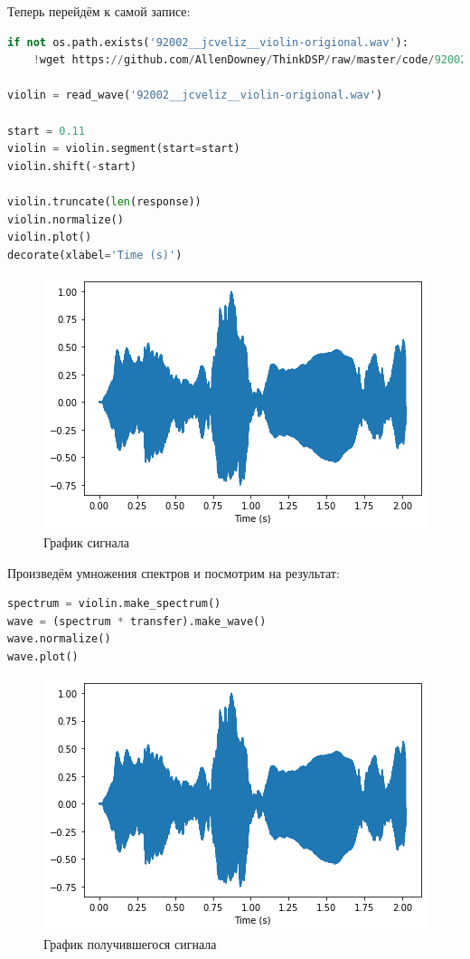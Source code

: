 Теперь перейдём к самой записе:

\begin{lstlisting}[language=Python]
if not os.path.exists('92002__jcveliz__violin-origional.wav'):
    !wget https://github.com/AllenDowney/ThinkDSP/raw/master/code/92002__jcveliz__violin-origional.wav
    
violin = read_wave('92002__jcveliz__violin-origional.wav')

start = 0.11
violin = violin.segment(start=start)
violin.shift(-start)

violin.truncate(len(response))
violin.normalize()
violin.plot()
decorate(xlabel='Time (s)')
\end{lstlisting}
\begin{figure}[H]
	\begin{center}
		\includegraphics[scale=1]{fig/lab10/lab10_9_0.png}
		\caption{График сигнала}
	\end{center}
\end{figure}

Произведём умножения спектров и посмотрим на результат:

\begin{lstlisting}[language=Python]
spectrum = violin.make_spectrum()
wave = (spectrum * transfer).make_wave()
wave.normalize()
wave.plot()
\end{lstlisting}
\begin{figure}[H]
	\begin{center}
		\includegraphics[scale=1]{fig/lab10/lab10_9_0.png}
		\caption{График получившегося сигнала}
	\end{center}
\end{figure}

